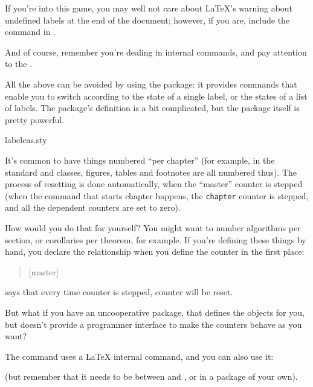 If you're into this game, you may well not care about \LaTeX{}'s
warning about undefined labels at the end of the document; however,
if you are, include the command  in
.

And of course, remember you're dealing in internal commands, and pay
attention to the .

All the above can be avoided by using the  package:
it provides commands that enable you to switch according to the state
of a single label, or the states of a list of labels.  The package's
definition is a bit complicated, but the package itself is pretty
powerful.
\begin{ctanrefs}
\item[labelcas.sty]
\end{ctanrefs}


It's common to have things numbered ``per chapter'' (for example, in
the standard  and  classes, figures, tables
and footnotes are all numbered thus).  The process of resetting is
done automatically, when the ``master'' counter is stepped (when the
 command that starts chapter  happens, the
\texttt{chapter} counter is stepped, and all the dependent counters are set
to zero).

How would you do that for yourself?  You might want to number
algorithms per section, or corollaries per theorem, for example.  If
you're defining these things by hand, you declare the relationship
when you define the counter in the first place:
\begin{quote}
[master]
\end{quote}
says that every time counter  is stepped, counter
 will be reset.

But what if you have an uncooperative package, that defines the
objects for you, but doesn't provide a programmer interface to make
the counters behave as you want?

The  command uses a \LaTeX{} internal command, and you
can also use it:
\begin{quote}
\end{quote}
(but remember that it needs to be between  and
, or in a package of your own).

